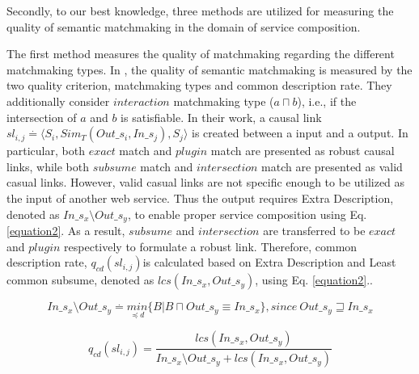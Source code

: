 Secondly, to our best knowledge, three methods  \cite{lecue2007making, pop2009immune,shet2012new} are utilized for measuring the quality of semantic matchmaking in the domain of service composition.

The first method measures the quality of matchmaking regarding the different matchmaking types. In \cite{lecue2007making}, the quality of semantic matchmaking is measured by the two quality criterion, matchmaking types and common description rate. They additionally consider $interaction$ matchmaking type ($a \sqcap b$), i.e., if the intersection of $a$ and $b$ is satisfiable. In their work, a causal link \begin{math} sl_{i,j} \stackrel{.}{=} \langle S_i, Sim_{T}(Out\_s_i,In\_s_j),S_j  \rangle \end{math} is created between a input and a output. In particular, both $exact$ match and $plugin$ match are presented as robust causal links, while both $subsume$ match and $intersection$ match are presented as valid casual links. However, valid casual links are not specific enough to be utilized as the input of another web service. Thus the output requires Extra Description, denoted as \begin{math} In\_s_x \setminus Out\_s_y \end{math}, to enable proper service composition using Eq. \ref{equation2}. As a result, $subsume$ and $intersection$ are transferred to be $exact$ and $plugin$ respectively to formulate a robust link. Therefore, common description rate, \begin{math} q_{cd}(sl_{i,j}) \end{math}is calculated based on Extra Description and Least common subsume, denoted as \begin{math} lcs (In\_s_x, Out\_s_y) \end{math}, using Eq. \ref{equation2}..

\begin{equation}
In\_s_x \setminus Out\_s_y \stackrel{.}{=} \underset {\preceq d}{min} \{ B|B\sqcap  Out\_s_y \equiv In\_s_x  \} , since \  Out\_s_y \sqsupseteq In\_s_x
 \label{equation2}
\end{equation}


\begin{equation}
q_{cd}(sl_{i,j}) = \frac{lcs (In\_s_x, Out\_s_y)} {In\_s_x \setminus Out\_s_y + lcs (In\_s_x, Out\_s_y)}
 \label{equation3}
\end{equation}

